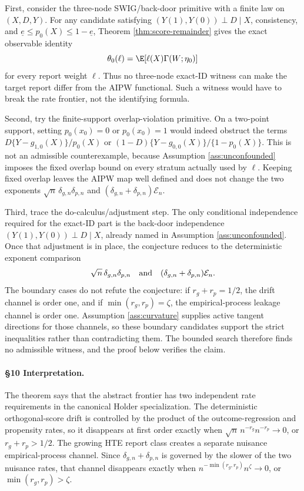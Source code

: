 First, consider the three-node SWIG/back-door primitive with a finite law on
\((X,D,Y)\).  For any candidate satisfying
\((Y(1),Y(0))\perp D\mid X\), consistency, and
\(\underline e\le p_0(X)\le1-\underline e\), Theorem
\ref{thm:score-remainder} gives the exact observable identity
\[
\theta_0(\ell)=\E[\ell(X)\Gamma(W;\eta_0)]
\]
for every report weight \(\ell\).  Thus no three-node exact-ID witness can
make the target report differ from the AIPW functional.  Such a witness would
have to break the rate frontier, not the identifying formula.

Second, try the finite-support overlap-violation primitive.  On a two-point
support, setting \(p_0(x_0)=0\) or \(p_0(x_0)=1\) would indeed obstruct the
terms \(D\{Y-g_{1,0}(X)\}/p_0(X)\) or
\((1-D)\{Y-g_{0,0}(X)\}/\{1-p_0(X)\}\).  This is not an admissible
counterexample, because Assumption \ref{ass:unconfounded} imposes the fixed
overlap bound on every stratum actually used by \(\ell\).  Keeping fixed
overlap leaves the AIPW map well defined and does not change the two exponents
\(\sqrt n\,\delta_{g,n}\delta_{p,n}\) and
\((\delta_{g,n}+\delta_{p,n})\mathcal{E}_n\).

Third, trace the do-calculus/adjustment step.  The only conditional
independence required for the exact-ID part is the back-door independence
\((Y(1),Y(0))\perp D\mid X\), already named in Assumption
\ref{ass:unconfounded}.  Once that adjustment is in place, the conjecture
reduces to the deterministic exponent comparison
\[
\sqrt n\,\delta_{g,n}\delta_{p,n}
\quad\hbox{and}\quad
(\delta_{g,n}+\delta_{p,n})\mathcal{E}_n.
\]
The boundary cases do not refute the conjecture: if \(r_g+r_p=1/2\), the
drift channel is order one, and if \(\min(r_g,r_p)=\zeta\), the
empirical-process leakage channel is order one.  Assumption
\ref{ass:curvature} supplies active tangent directions for those channels, so
these boundary candidates support the strict inequalities rather than
contradicting them.  The bounded search therefore finds no admissible witness,
and the proof below verifies the claim.

\paragraph{\S10 Interpretation.}
The theorem says that the abstract frontier has two independent rate
requirements in the canonical Holder specialization.  The deterministic
orthogonal-score drift is controlled by the product of the outcome-regression
and propensity rates, so it disappears at first order exactly when
\(\sqrt n\,n^{-r_g}n^{-r_p}\to0\), or \(r_g+r_p>1/2\).  The growing HTE report
class creates a separate nuisance empirical-process channel.  Since
\(\delta_{g,n}+\delta_{p,n}\) is governed by the slower of the two nuisance
rates, that channel disappears exactly when
\(n^{-\min(r_g,r_p)}n^\zeta\to0\), or \(\min(r_g,r_p)>\zeta\).


